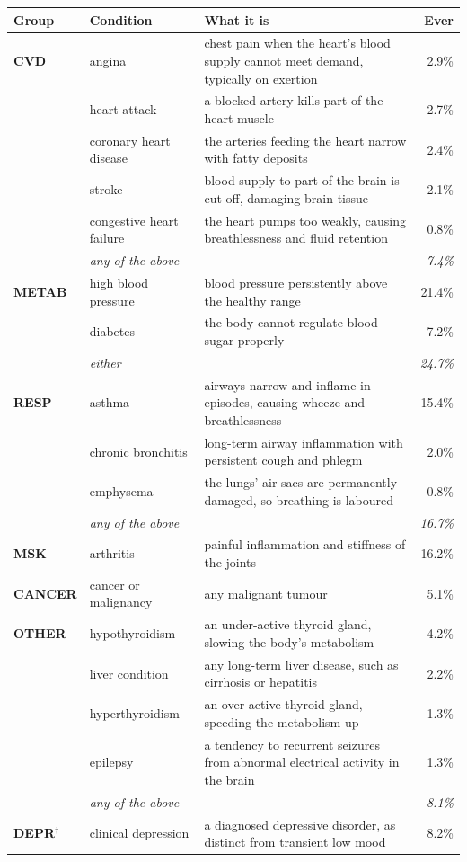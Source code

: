 \documentclass[11pt]{article}
\begin{document}
\begin{center}\small
\begin{tabular}{llp{6.5cm}r}
\toprule
Group & Condition & What it is & Ever \\
\midrule
\textbf{CVD} & angina & chest pain when the heart's blood supply cannot meet demand, typically on exertion & 2.9\% \\
 & heart attack & a blocked artery kills part of the heart muscle & 2.7\% \\
 & coronary heart disease & the arteries feeding the heart narrow with fatty deposits & 2.4\% \\
 & stroke & blood supply to part of the brain is cut off, damaging brain tissue & 2.1\% \\
 & congestive heart failure & the heart pumps too weakly, causing breathlessness and fluid retention & 0.8\% \\
 & \emph{any of the above} & & \emph{7.4\%} \\
\addlinespace
\textbf{METAB} & high blood pressure & blood pressure persistently above the healthy range & 21.4\% \\
 & diabetes & the body cannot regulate blood sugar properly & 7.2\% \\
 & \emph{either} & & \emph{24.7\%} \\
\addlinespace
\textbf{RESP} & asthma & airways narrow and inflame in episodes, causing wheeze and breathlessness & 15.4\% \\
 & chronic bronchitis & long-term airway inflammation with persistent cough and phlegm & 2.0\% \\
 & emphysema & the lungs' air sacs are permanently damaged, so breathing is laboured & 0.8\% \\
 & \emph{any of the above} & & \emph{16.7\%} \\
\addlinespace
\textbf{MSK} & arthritis & painful inflammation and stiffness of the joints & 16.2\% \\
\addlinespace
\textbf{CANCER} & cancer or malignancy & any malignant tumour & 5.1\% \\
\addlinespace
\textbf{OTHER} & hypothyroidism & an under-active thyroid gland, slowing the body's metabolism & 4.2\% \\
 & liver condition & any long-term liver disease, such as cirrhosis or hepatitis & 2.2\% \\
 & hyperthyroidism & an over-active thyroid gland, speeding the metabolism up & 1.3\% \\
 & epilepsy & a tendency to recurrent seizures from abnormal electrical activity in the brain & 1.3\% \\
 & \emph{any of the above} & & \emph{8.1\%} \\
\addlinespace
\textbf{DEPR}$^{\dagger}$ & clinical depression & a diagnosed depressive disorder, as distinct from transient low mood & 8.2\% \\
\bottomrule
\end{tabular}


\end{center}
\end{document}
